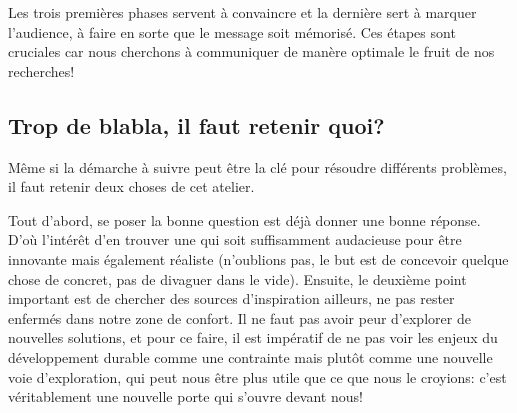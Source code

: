 Les trois premières phases servent à convaincre et la dernière sert à marquer l’audience, à faire en sorte que le message soit mémorisé. Ces étapes sont cruciales car nous cherchons à communiquer de manère optimale le fruit de nos recherches!


\subsection{Trop de blabla, il faut retenir quoi?}

Même si la démarche à suivre peut être la clé pour résoudre différents problèmes, il faut retenir deux choses de cet atelier. 

Tout d'abord, se poser la bonne question est déjà donner une bonne réponse. D’où l’intérêt d'en trouver une qui soit suffisamment audacieuse pour être innovante mais également réaliste (n'oublions pas, le but est de concevoir quelque chose de concret, pas de divaguer dans le vide). Ensuite, le deuxième point important est de chercher des sources d'inspiration ailleurs, ne pas rester enfermés dans notre zone de confort. Il ne faut pas avoir peur d'explorer de nouvelles solutions, et pour ce faire, il est impératif de ne pas voir les enjeux du développement durable comme une contrainte mais plutôt comme une nouvelle voie d'exploration, qui peut nous être plus utile que ce que nous le croyions: c'est véritablement une nouvelle porte qui s'ouvre devant nous!
